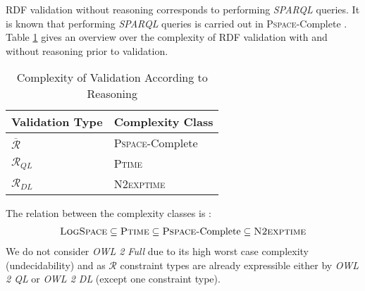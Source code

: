 \documentclass{acm_proc_article-sp}
\begin{document}
RDF validation without reasoning corresponds to performing \emph{SPARQL} queries.  
It is known that performing \emph{SPARQL} queries is carried out in \textsc{Pspace}-Complete \cite{Perez2009}. 
Table \ref{tab:constraint-type-specific-complexity-classes} gives an overview over the complexity of RDF validation with and without reasoning prior to validation.
\begin{table}[H]
\centering
\caption{Complexity of Validation According to Reasoning}
\scriptsize
\begin{tabular}{>{\centering\arraybackslash}m{1.5in} | >{\centering\arraybackslash}m{1in}} 
\textbf{Validation Type}  & \textbf{Complexity Class}\\
\hline
$\overline{\mathcal{R}}$ & \textsc{Pspace}-Complete \\[7pt] 
\hline
$\mathcal{R}_{QL}$ & \textsc{Ptime} \\[7pt]
\hline
$\mathcal{R}_{DL}$ & \textsc{N2exptime} \\[7pt]
\end{tabular}
\label{tab:constraint-type-specific-complexity-classes}
\end{table}
The relation between the complexity classes is \cite{Arora:2009:CCM:1540612}:
\begin{eqnarray*}
\textsc{LogSpace} \subseteq \textsc{Ptime} \subseteq \textsc{Pspace-}\text{Complete} \subseteq \textsc{N2exptime} 
\end{eqnarray*}
We do not consider \emph{OWL 2 Full} 
due to its high worst case complexity (undecidability) and
as $\mathcal{R}$ constraint types are already expressible either by \emph{OWL 2 QL} or \emph{OWL 2 DL} (except one constraint type).

\end{document}

